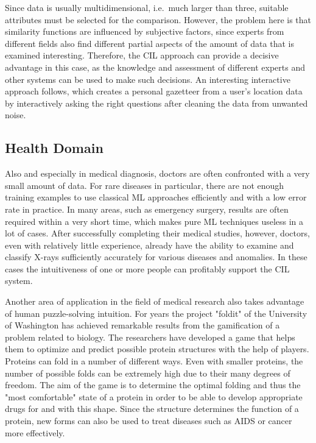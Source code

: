 \documentclass[conference]{IEEEtran}
\begin{document}
Since data is usually multidimensional, i.e.\ much larger than three, suitable attributes must be selected for the comparison. 
However, the problem here is that similarity functions are influenced by subjective factors, since experts from different 
fields also find different partial aspects of the amount of data that is examined interesting.
Therefore, the CIL approach can provide a decisive advantage in this case, as the knowledge and assessment of 
different experts and other systems can be used to make such decisions.
An interesting interactive approach follows\cite{DJ:frankowski}, which creates a personal gazetteer from a user's location data 
by interactively asking the right questions after cleaning the data from unwanted noise.

\subsection{Health Domain}
Also and especially in medical diagnosis, doctors are often confronted with a very small amount of data.
For rare diseases in particular, there are not enough training examples to use classical ML approaches efficiently and with a low error rate in practice.
In many areas, such as emergency surgery, results are often required within a very short time, which makes pure ML techniques useless in a lot of cases.
After successfully completing their medical studies, however, doctors, even with relatively little experience, already have the ability to examine and classify X-rays sufficiently accurately for various diseases and anomalies.
In these cases the intuitiveness of one or more people can profitably support the CIL system.

Another area of application in the field of medical research also takes advantage of human puzzle-solving intuition. 
For years the project "foldit" of the University of Washington has achieved remarkable results\cite{Foldit:results} from the gamification of a problem related to biology.
The researchers have developed a game that helps them to optimize and predict possible protein structures with the help of 
players\cite{Foldit:web}.
Proteins can fold in a number of different ways. Even with smaller proteins, the number of possible folds can be extremely high due to their many degrees of freedom.
The aim of the game is to determine the optimal folding and thus the "most comfortable" state of a protein in order to be able to develop appropriate drugs for and with this shape.
Since the structure determines the function of a protein\cite{Foldit:web}, new forms can also be used to treat diseases such as AIDS or cancer more effectively.
\end{document}
